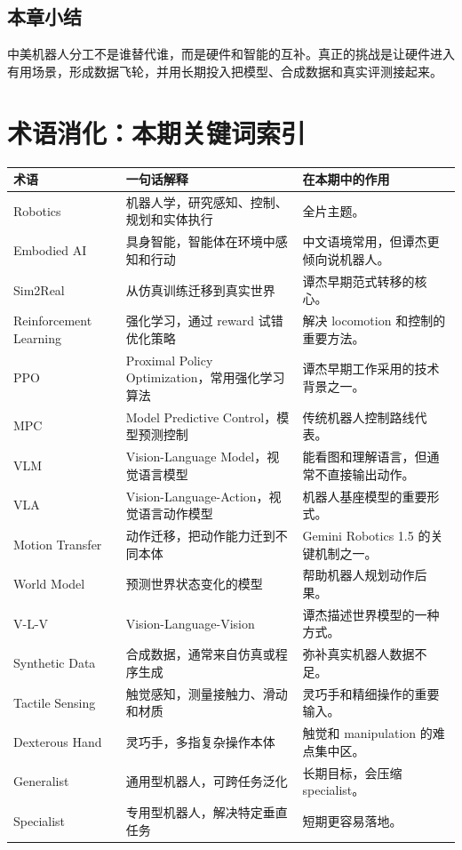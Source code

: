 \documentclass[a4paper]{article}
\begin{document}
\subsection{本章小结}

中美机器人分工不是谁替代谁，而是硬件和智能的互补。真正的挑战是让硬件进入有用场景，形成数据飞轮，并用长期投入把模型、合成数据和真实评测接起来。

\section{术语消化：本期关键词索引}

\begin{longtable}{p{}p{}p{}}
\toprule
术语 & 一句话解释 & 在本期中的作用 \\
\midrule
Robotics & 机器人学，研究感知、控制、规划和实体执行 & 全片主题。 \\
Embodied AI & 具身智能，智能体在环境中感知和行动 & 中文语境常用，但谭杰更倾向说机器人。 \\
Sim2Real & 从仿真训练迁移到真实世界 & 谭杰早期范式转移的核心。 \\
Reinforcement Learning & 强化学习，通过 reward 试错优化策略 & 解决 locomotion 和控制的重要方法。 \\
PPO & Proximal Policy Optimization，常用强化学习算法 & 谭杰早期工作采用的技术背景之一。 \\
MPC & Model Predictive Control，模型预测控制 & 传统机器人控制路线代表。 \\
VLM & Vision-Language Model，视觉语言模型 & 能看图和理解语言，但通常不直接输出动作。 \\
VLA & Vision-Language-Action，视觉语言动作模型 & 机器人基座模型的重要形式。 \\
Motion Transfer & 动作迁移，把动作能力迁到不同本体 & Gemini Robotics 1.5 的关键机制之一。 \\
World Model & 预测世界状态变化的模型 & 帮助机器人规划动作后果。 \\
V-L-V & Vision-Language-Vision & 谭杰描述世界模型的一种方式。 \\
Synthetic Data & 合成数据，通常来自仿真或程序生成 & 弥补真实机器人数据不足。 \\
Tactile Sensing & 触觉感知，测量接触力、滑动和材质 & 灵巧手和精细操作的重要输入。 \\
Dexterous Hand & 灵巧手，多指复杂操作本体 & 触觉和 manipulation 的难点集中区。 \\
Generalist & 通用型机器人，可跨任务泛化 & 长期目标，会压缩 specialist。 \\
Specialist & 专用型机器人，解决特定垂直任务 & 短期更容易落地。 \\
\bottomrule
\end{longtable}
\end{document}

